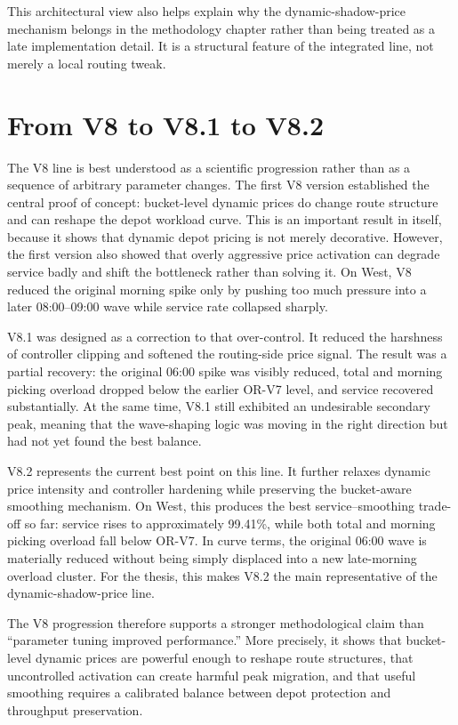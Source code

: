 This architectural view also helps explain why the dynamic-shadow-price mechanism belongs in the methodology chapter rather than being treated as a late implementation detail. It is a structural feature of the integrated line, not merely a local routing tweak.

\section{From V8 to V8.1 to V8.2}

The V8 line is best understood as a scientific progression rather than as a sequence of arbitrary parameter changes. The first V8 version established the central proof of concept: bucket-level dynamic prices do change route structure and can reshape the depot workload curve. This is an important result in itself, because it shows that dynamic depot pricing is not merely decorative. However, the first version also showed that overly aggressive price activation can degrade service badly and shift the bottleneck rather than solving it. On West, V8 reduced the original morning spike only by pushing too much pressure into a later 08:00--09:00 wave while service rate collapsed sharply.

V8.1 was designed as a correction to that over-control. It reduced the harshness of controller clipping and softened the routing-side price signal. The result was a partial recovery: the original 06:00 spike was visibly reduced, total and morning picking overload dropped below the earlier OR-V7 level, and service recovered substantially. At the same time, V8.1 still exhibited an undesirable secondary peak, meaning that the wave-shaping logic was moving in the right direction but had not yet found the best balance.

V8.2 represents the current best point on this line. It further relaxes dynamic price intensity and controller hardening while preserving the bucket-aware smoothing mechanism. On West, this produces the best service--smoothing trade-off so far: service rises to approximately 99.41\%, while both total and morning picking overload fall below OR-V7. In curve terms, the original 06:00 wave is materially reduced without being simply displaced into a new late-morning overload cluster. For the thesis, this makes V8.2 the main representative of the dynamic-shadow-price line.

The V8 progression therefore supports a stronger methodological claim than ``parameter tuning improved performance.'' More precisely, it shows that bucket-level dynamic prices are powerful enough to reshape route structures, that uncontrolled activation can create harmful peak migration, and that useful smoothing requires a calibrated balance between depot protection and throughput preservation.

